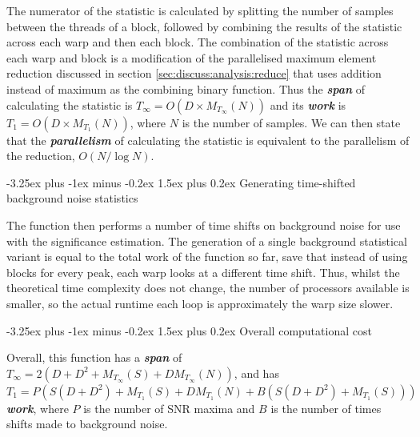 \documentclass{article}
\makeatletter
\renewcommand{\paragraph}{\@startsection{paragraph}{4}{0ex}%
    {-3.25ex plus -1ex minus -0.2ex}%
    {1.5ex plus 0.2ex}%
    {\normalfont\normalsize\bfseries}}
\makeatother
\begin{document}
The numerator of the statistic is calculated by splitting the number of samples between the threads of a block, followed by combining the results of the statistic across each warp and then each block.
The combination of the statistic across each warp and block is a modification of the parallelised maximum element reduction discussed in section \ref{sec:discuss:analysis:reduce} that uses addition instead of maximum as the combining binary function.
Thus the \textit{\textbf{span}} of calculating the statistic is \(T_\infty = O(D\times{M_{T_\infty}(N)})\) and its \textit{\textbf{work}} is \(T_1 = O(D\times{M_{T_1}(N)})\), where \(N\) is the number of samples.
We can then state that the \textit{\textbf{parallelism}} of calculating the statistic is equivalent to the parallelism of the reduction, \(O(N/\log N)\).

\paragraph{Generating time-shifted background noise statistics} \label{sec:discuss:analysis:background}

%
The function then performs a number of time shifts on background noise for use with the significance estimation.
The generation of a single background statistical variant is equal to the total work of the function so far, save that instead of using blocks for every peak, each warp looks at a different time shift.
Thus, whilst the theoretical time complexity does not change, the number of processors available is smaller, so the actual runtime each loop is approximately the warp size slower.

\paragraph{Overall computational cost} \label{sec:discuss:analysis:versatile_cost}

Overall, this function has a \textit{\textbf{span}} of \(T_\infty = 2(D + D^2 + M_{T_\infty}(S) + DM_{T_\infty}(N))\), and has \(T_1 = P(S(D + D^2) + M_{T_1}(S) + DM_{T_1}(N) + B(S(D + D^2) + M_{T_1}(S)))\) \textit{\textbf{work}}, where \(P\) is the number of SNR maxima and \(B\) is the number of times shifts made to background noise.
\end{document}
